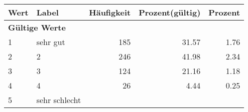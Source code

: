      \begin{longtable}{lXrrr}
     \toprule
     \textbf{Wert} & \textbf{Label} & \textbf{Häufigkeit} & \textbf{Prozent(gültig)} & \textbf{Prozent} \\
     \endhead
     \midrule
     \multicolumn{5}{l}{\textbf{Gültige Werte}}\\

     1 &
     \multicolumn{1}{X}{ sehr gut   } &


       \num{185} &
       \num[round-mode=places,round-precision=2]{31.57} &
         \num[round-mode=places,round-precision=2]{1.76} \\

     2 &
     \multicolumn{1}{X}{ 2   } &


       \num{246} &
       \num[round-mode=places,round-precision=2]{41.98} &
         \num[round-mode=places,round-precision=2]{2.34} \\

     3 &
     \multicolumn{1}{X}{ 3   } &


       \num{124} &
       \num[round-mode=places,round-precision=2]{21.16} &
         \num[round-mode=places,round-precision=2]{1.18} \\

     4 &
     \multicolumn{1}{X}{ 4   } &


       \num{26} &
       \num[round-mode=places,round-precision=2]{4.44} &
         \num[round-mode=places,round-precision=2]{0.25} \\

     5 &
     \multicolumn{1}{X}{ sehr schlecht   } &



\end{longtable}
